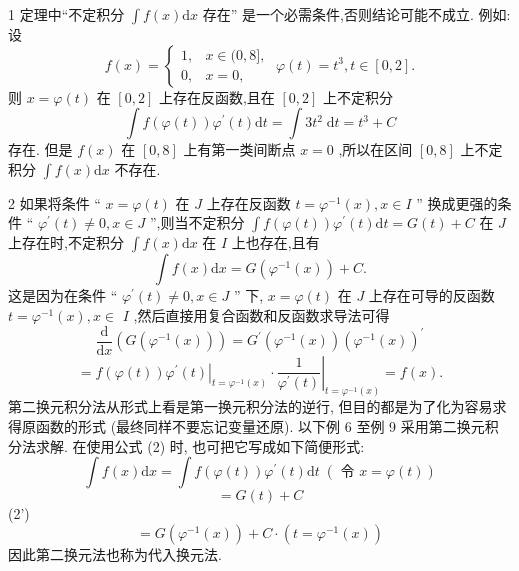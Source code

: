 \begin{remark}

\end{remark}
1 定理中“不定积分 \(\int f\left( x\right) \mathrm{d}x\) 存在” 是一个必需条件,否则结论可能不成立. 例如: 设
\[
f\left( x\right)  = \left\{  {\begin{array}{ll} 1, & x \in  (0,8\rbrack , \\  0, & x = 0, \end{array}\;\varphi \left( t\right)  = {t}^{3},t \in  \left\lbrack  {0,2}\right\rbrack  .}\right.
\]
则 \(x = \varphi \left( t\right)\) 在 \(\left\lbrack  {0,2}\right\rbrack\) 上存在反函数,且在 \(\left\lbrack  {0,2}\right\rbrack\) 上不定积分
\[
\int f\left( {\varphi \left( t\right) }\right) {\varphi }^{\prime }\left( t\right) \mathrm{d}t = \int 3{t}^{2}\mathrm{\;d}t = {t}^{3} + C
\]
存在. 但是 \(f\left( x\right)\) 在 \(\left\lbrack  {0,8}\right\rbrack\) 上有第一类间断点 \(x = 0\) ,所以在区间 \(\left\lbrack  {0,8}\right\rbrack\) 上不定积分 \(\int f\left( x\right) \mathrm{d}x\) 不存在.

\begin{remark}

\end{remark}
2 如果将条件 “ \(x = \varphi \left( t\right)\) 在 \(J\) 上存在反函数 \(t = {\varphi }^{-1}\left( x\right) ,x \in  I\) ” 换成更强的条件 “ \({\varphi }^{\prime }\left( t\right)  \neq  0,x \in  J\) ”,则当不定积分 \(\int f\left( {\varphi \left( t\right) }\right) {\varphi }^{\prime }\left( t\right) \mathrm{d}t = G\left( t\right)  + C\) 在 \(J\) 上存在时,不定积分 \(\int f\left( x\right) \mathrm{d}x\) 在 \(I\) 上也存在,且有
\[
\int f\left( x\right) \mathrm{d}x = G\left( {{\varphi }^{-1}\left( x\right) }\right)  + C.
\]
这是因为在条件 “ \({\varphi }^{\prime }\left( t\right)  \neq  0,x \in  J\) ” 下, \(x = \varphi \left( t\right)\) 在 \(J\) 上存在可导的反函数 \(t = {\varphi }^{-1}\left( x\right) ,x \in\)  \(I\) ,然后直接用复合函数和反函数求导法可得
\[
\frac{\mathrm{d}}{\mathrm{d}x}\left( {G\left( {{\varphi }^{-1}\left( x\right) }\right) }\right)  = {G}^{\prime }\left( {{\varphi }^{-1}\left( x\right) }\right) {\left( {\varphi }^{-1}\left( x\right) \right) }^{\prime }
\]
\[
= {\left. f\left( \varphi \left( t\right) \right) {\varphi }^{\prime }\left( t\right) \right| }_{t = {\varphi }^{-1}\left( x\right) } \cdot  {\left. \frac{1}{{\varphi }^{\prime }\left( t\right) }\right| }_{t = {\varphi }^{-1}\left( x\right) } = f\left( x\right) .
\]
第二换元积分法从形式上看是第一换元积分法的逆行, 但目的都是为了化为容易求得原函数的形式 (最终同样不要忘记变量还原). 以下例 6 至例 9 采用第二换元积分法求解. 在使用公式 (2) 时, 也可把它写成如下简便形式:
\[
\int f\left( x\right) \mathrm{d}x = \int f\left( {\varphi \left( t\right) }\right) {\varphi }^{\prime }\left( t\right) \mathrm{d}t\;\left( {\text{ 令 }x = \varphi \left( t\right) }\right)
\]
\[
= G\left( t\right)  + C
\]
 (2')
\[
= G\left( {{\varphi }^{-1}\left( x\right) }\right)  + C \cdot  \left( {t = {\varphi }^{-1}\left( x\right) }\right)
\]
因此第二换元法也称为代入换元法.

